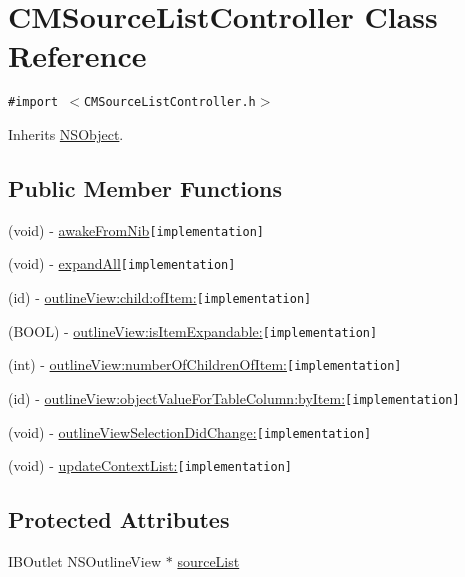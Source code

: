 \hypertarget{interface_c_m_source_list_controller}{
\section{CMSourceListController Class Reference}
\label{interface_c_m_source_list_controller}
}
{\tt \#import $<$CMSourceListController.h$>$}

Inherits \hyperlink{class_n_s_object}{NSObject}.

\subsection*{Public Member Functions}
\begin{CompactItemize}
\item 
(void) - \hyperlink{interface_c_m_source_list_controller_677c7a66e0298c1edfc00d1251134415}{awakeFromNib}{\tt  \mbox{[}implementation\mbox{]}}
\item 
(void) - \hyperlink{interface_c_m_source_list_controller_aef5e556c40b91df8096bd841293c37f}{expandAll}{\tt  \mbox{[}implementation\mbox{]}}
\item 
(id) - \hyperlink{interface_c_m_source_list_controller_413c1e8e88baf3f11ee129d9c6f4affe}{outlineView:child:ofItem:}{\tt  \mbox{[}implementation\mbox{]}}
\item 
(BOOL) - \hyperlink{interface_c_m_source_list_controller_849b93a679db8f1ce7a36f21b560f20f}{outlineView:isItemExpandable:}{\tt  \mbox{[}implementation\mbox{]}}
\item 
(int) - \hyperlink{interface_c_m_source_list_controller_23280fb2b7d304f6d487c0e4a715254a}{outlineView:numberOfChildrenOfItem:}{\tt  \mbox{[}implementation\mbox{]}}
\item 
(id) - \hyperlink{interface_c_m_source_list_controller_4739ca00e2985b8ae07c90bf0d7ce557}{outlineView:objectValueForTableColumn:byItem:}{\tt  \mbox{[}implementation\mbox{]}}
\item 
(void) - \hyperlink{interface_c_m_source_list_controller_bac87a14d1267eb7ded56bec2b904043}{outlineViewSelectionDidChange:}{\tt  \mbox{[}implementation\mbox{]}}
\item 
(void) - \hyperlink{interface_c_m_source_list_controller_d0a020d93ede188cbd34188e562497c4}{updateContextList:}{\tt  \mbox{[}implementation\mbox{]}}
\end{CompactItemize}
\subsection*{Protected Attributes}
\begin{CompactItemize}
\item 
IBOutlet NSOutlineView $\ast$ \hyperlink{interface_c_m_source_list_controller_3ecaeac5cbd5f29ff48aeb1d7a2ef494}{sourceList}
\end{CompactItemize}



